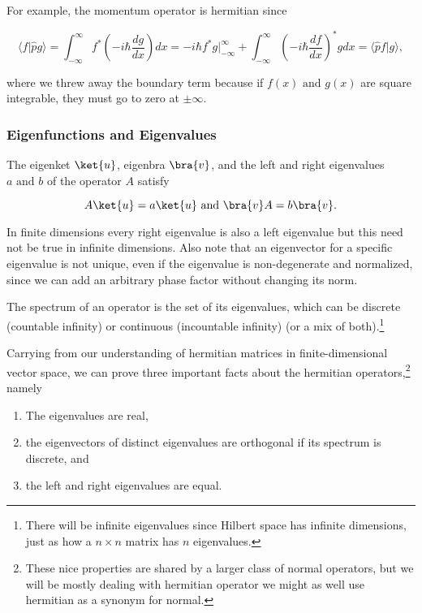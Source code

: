 \documentclass[a4paper,12pt]{report}
\begin{document}
For example, the momentum operator is hermitian since

\begin{equation}
  \langle f \vert \hat{p} g \rangle = \int_{-\infty}^\infty f^* \left( -i\hbar \frac{dg}{dx} \right) dx = -i\hbar f^* g \bigg|_{-\infty}^\infty + \int_{-\infty}^\infty \left( -i\hbar \frac{df}{dx} \right)^* g  dx = \langle \hat{p} f \vert g \rangle,
\end{equation}

where we threw away the boundary term because if \(f(x) \text { and } g(x)\) are square integrable, they must go to zero at \(\pm \infty\).

\subsubsection{Eigenfunctions and Eigenvalues}

The eigenket \(\ket{u} \), eigenbra \(\bra{v} \), and the left and right eigenvalues \(a \text { and } b\) of the operator \(A\) satisfy 

\begin{equation}
  A \ket{u} = a\ket{u} \text { and } \bra{v}A = b \bra{v}.
\end{equation}

In finite dimensions every right eigenvalue is also a left eigenvalue but this need not be true in infinite dimensions. Also note that an eigenvector for a specific eigenvalue is not unique, even if the eigenvalue is non-degenerate and normalized, since we can add an arbitrary phase factor without changing its norm.

The spectrum of an operator is the set of its eigenvalues, which can be discrete (countable infinity) or continuous (incountable infinity) (or a mix of both).\footnote{There will be infinite eigenvalues since Hilbert space has infinite dimensions, just as how a \(n \times n\) matrix has \(n\) eigenvalues. } 

Carrying from our understanding of hermitian matrices in finite-dimensional vector space, we can prove three important facts about the hermitian operators,\footnote{These nice properties are shared by a larger class of normal operators, but we will be mostly dealing with hermitian operator we might as well use hermitian as a synonym for normal.} namely

\begin{enumerate}
  \item The eigenvalues are real,
  \item the eigenvectors of distinct eigenvalues are orthogonal if its spectrum is discrete, and
  \item the left and right eigenvalues are equal.
\end{enumerate}
\end{document}
